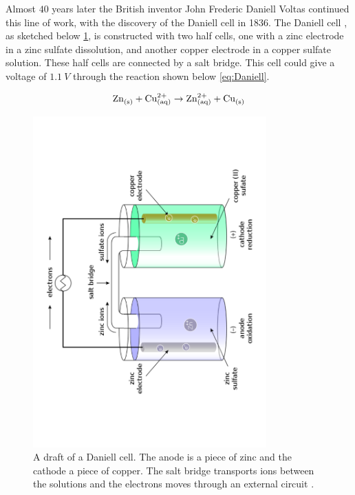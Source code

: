 Almost $40$ years later the British inventor John Frederic Daniell Voltas continued this line of work, with the discovery of the Daniell cell \cite{daniell1836xi} in 1836. The Daniell cell , as sketched below \ref{fig:DaniellCell}, is constructed with two half cells, one with a zinc electrode in a zinc sulfate dissolution, and another copper electrode in a copper sulfate solution. These half cells are connected by a salt bridge. This cell could give a voltage of $\SI{1.1}{V}$ through the reaction shown below \ref{eq:Daniell}. 


\begin{align}\label{eq:Daniell}
\ce{Zn_{(s)}} + \ce{Cu^{2+}_{(aq)}} \rightarrow \ce{Zn^2+_{(aq)}} + \ce{Cu_{(s)}} 
\end{align}

\begin{figure}[ht]
    \centering
    \includegraphics[angle=270,width=0.8\textwidth]{600px-Galvanic_cell_labeled.pdf}
    \caption[format=plain]{A draft of a Daniell cell. The anode is a piece of zinc and the cathode a piece of copper. The salt bridge transports ions between the solutions and the electrons moves through an external circuit \cite{wiki:Daniellcell}. }
    \label{fig:DaniellCell}
\end{figure}


